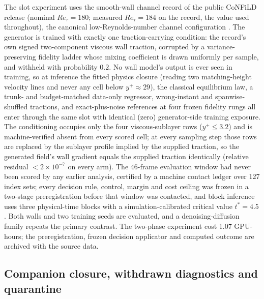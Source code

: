The slot experiment uses the smooth-wall channel record of the public CoNFiLD release
(nominal $Re_\tau=180$; measured $Re_\tau=184$ on the record, the value used throughout), the
canonical low-Reynolds-number channel configuration \cite{kim1987turbulence}. The generator is trained with exactly one traction-carrying condition: the
record's own signed two-component viscous wall traction, corrupted by a variance-preserving
fidelity ladder whose mixing coefficient is drawn uniformly per sample, and withheld with
probability $0.2$. No wall model's output is ever seen in training, so at inference the fitted
physics closure (reading two matching-height velocity lines and never any cell below
$y^+\approx29$), the classical equilibrium law, a trunk- and budget-matched data-only regressor,
wrong-instant and spanwise-shuffled tractions, and exact-plus-noise references at four frozen
fidelity rungs all enter through the same slot with identical (zero) generator-side training
exposure. The conditioning occupies only the four viscous-sublayer rows ($y^+\leq3.2$) and is
machine-verified absent from every scored cell; at every sampling step those rows are replaced by
the sublayer profile implied by the supplied traction, so the generated field's wall gradient
equals the supplied traction identically (relative residual $<2\times10^{-7}$ on every arm). The
46-frame evaluation window had never been scored by any earlier analysis, certified by a machine
contact ledger over 127 index sets; every decision rule, control, margin and cost ceiling was
frozen in a two-stage preregistration before that window was contacted, and block inference uses
three physical-time blocks with a simulation-calibrated critical value $t^\ast=4.5$. Both walls
and two training seeds are evaluated, and a denoising-diffusion family repeats the primary
contrast. The two-phase experiment cost 1.07 GPU-hours; the preregistration, frozen decision
applicator and computed outcome are archived with the source data.

\subsection{Companion closure, withdrawn diagnostics and quarantine}\label{sec:closuremethod}\label{sec:repro}

